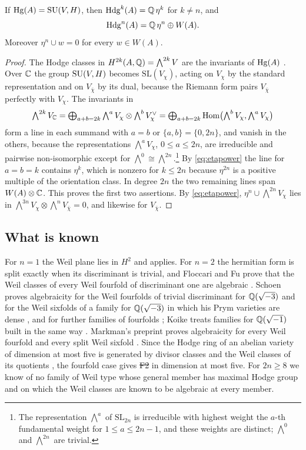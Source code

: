 \begin{proposition}\label{prop:hodgering}
If $\operatorname{Hg}(A)=\operatorname{SU}(V,H)$, then $\operatorname{Hdg}^{k}(A)=\mathbb{Q}\,\eta^{k}$ for $k\ne n$, and
\[
  \operatorname{Hdg}^{n}(A)=\mathbb{Q}\,\eta^{n}\oplus W(A).
\]
Moreover $\eta^{n}\cup w=0$ for every $w\in W(A)$.
\end{proposition}

\begin{proof}
The Hodge classes in $H^{2k}(A,\mathbb{Q})=\bigwedge^{2k}V$ are the invariants of
$\operatorname{Hg}(A)$ \cite[\S3]{Del82}. Over $\mathbb{C}$ the group $\operatorname{SU}(V,H)$ becomes
$\mathrm{SL}(V_{\chi})$, acting on $V_{\chi}$ by the standard representation
and on $V_{\bar\chi}$ by its dual, because the Riemann form pairs
$V_{\bar\chi}$ perfectly with $V_{\chi}$. The invariants in
\[
  \textstyle\bigwedge^{2k}V_{\mathbb{C}}=\bigoplus_{a+b=2k}\bigwedge^{a}V_{\chi}
  \otimes\bigwedge^{b}V_{\chi}^{\vee}
  =\bigoplus_{a+b=2k}\operatorname{Hom}\bigl(\bigwedge^{b}V_{\chi},
  \bigwedge^{a}V_{\chi}\bigr)
\]
form a line in each summand with $a=b$ or $\{a,b\}=\{0,2n\}$, and vanish in
the others, because the representations $\bigwedge^{a}V_{\chi}$, $0\le
a\le2n$, are irreducible and pairwise non-isomorphic except for
$\bigwedge^{0}\cong\bigwedge^{2n}$.\footnote{The representation
$\bigwedge^{a}$ of $\mathrm{SL}_{2n}$ is irreducible with highest weight the
$a$-th fundamental weight for $1\le a\le 2n-1$, and these weights are
distinct; $\bigwedge^{0}$ and $\bigwedge^{2n}$ are trivial.} By
\eqref{eq:etapower} the line for $a=b=k$ contains $\eta^{k}$, which is
nonzero for $k\le2n$ because $\eta^{2n}$ is a positive multiple of the
orientation class. In degree $2n$ the two remaining lines span
$W(A)\otimes\mathbb{C}$. This proves the first two assertions. By
\eqref{eq:etapower}, $\eta^{n}\cup\bigwedge^{2n}V_{\chi}$ lies in
$\bigwedge^{3n}V_{\chi}\otimes\bigwedge^{n}V_{\bar\chi}=0$, and likewise for
$V_{\bar\chi}$.
\end{proof}

\subsection{What is known}\label{ssec:weilknown}
For $n=1$ the Weil plane lies in $H^{2}$ and  applies. For
$n=2$ the hermitian form is split exactly when its discriminant is trivial,
and Floccari and Fu prove that the Weil classes of every Weil fourfold of
discriminant one are algebraic \cite{FF26}. Schoen proves algebraicity for
the Weil fourfolds of trivial discriminant for $\mathbb{Q}(\sqrt{-3})$ and for the
Weil sixfolds of a family for $\mathbb{Q}(\sqrt{-3})$ in which his Prym varieties
are dense \cite{Sch88,Sch98}, and for further families of fourfolds
\cite{Sch98}; Koike treats families for $\mathbb{Q}(\sqrt{-1})$ built in the same
way \cite{Koi04}. Markman's preprint proves algebraicity for every Weil
fourfold and every split Weil sixfold \cite{Mar25a}. Since the Hodge ring of
an abelian variety of dimension at most five is generated by divisor classes
and the Weil classes of its quotients \cite{MZ99}, the fourfold case gives
\st{F2} in dimension at most five. For $2n\ge8$ we know of
no family of Weil type whose general member has maximal Hodge group and on
which the Weil classes are known to be algebraic at every member.

